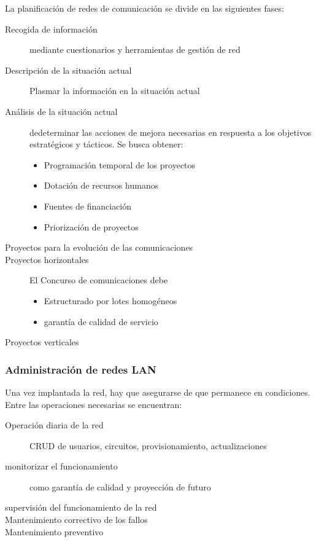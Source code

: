         La planificación de redes de comunicación se divide en las siguientes fases:
        \begin{description}
            \item[Recogida de información] mediante cuestionarios y herramientas de gestión de red
            \item[Descripción de la situación actual] Plasmar la información en la situación actual
            \item[Análisis de la situación actual] dedeterminar las acciones de mejora necesarias en respuesta a los objetivos estratégicos y tácticos. Se busca obtener: \begin{itemize}
                \item Programación temporal de los proyectos
                \item Dotación de recursos humanos
                \item Fuentes de financiación
                \item Priorización de proyectos
            \end{itemize}
            \item[Proyectos para la evolución de las comunicaciones]
            \item[Proyectos horizontales] El Concurso de comunicaciones debe \begin{itemize}
                \item Estructurado por lotes homogéneos
                \item garantía de calidad de servicio
            \end{itemize}
            \item[Proyectos verticales]
        \end{description}

    \subsubsection{Administración de redes LAN} %
        Una vez implantada la red, hay que asegurarse de que permanece en condiciones. Entre las operaciones necesarias se encuentran:
        \begin{description}
            \item[Operación diaria de la red] CRUD de usuarios, circuitos, provisionamiento, actualizaciones
            \item[monitorizar el funcionamiento] como garantía de calidad y proyección de futuro
            \item[supervisión del funcionamiento de la red]
            \item[Mantenimiento correctivo de los fallos]
            \item[Mantenimiento preventivo]
        \end{description}


